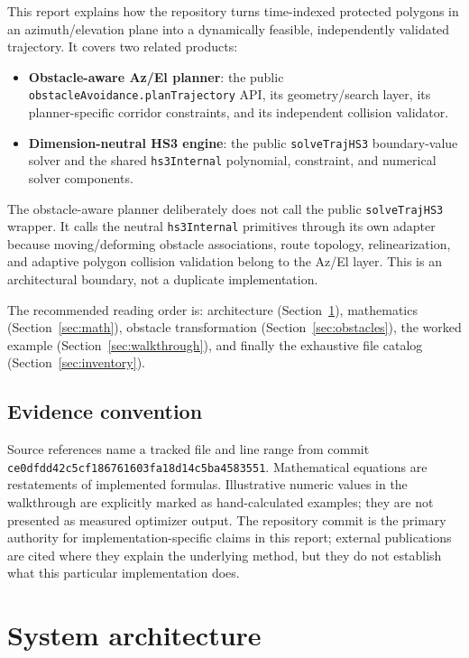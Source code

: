 \documentclass[10pt,letterpaper]{article}
\newcommand{\file}[1]{\nolinkurl{#1}}
\newcommand{\term}[1]{\textbf{#1}}
\begin{document}
This report explains how the repository turns time-indexed protected polygons
in an azimuth/elevation plane into a dynamically feasible, independently
validated trajectory. It covers two related products:

\begin{itemize}
  \item \term{Obstacle-aware Az/El planner}: the public
  \file{obstacleAvoidance.planTrajectory} API, its geometry/search layer, its
  planner-specific corridor constraints, and its independent collision
  validator.
  \item \term{Dimension-neutral HS3 engine}: the public
  \file{solveTrajHS3} boundary-value solver and the shared
  \file{hs3Internal} polynomial, constraint, and numerical solver components.
\end{itemize}

The obstacle-aware planner deliberately does not call the public
\file{solveTrajHS3} wrapper. It calls the neutral \file{hs3Internal}
primitives through its own adapter because moving/deforming obstacle
associations, route topology, relinearization, and adaptive polygon collision
validation belong to the Az/El layer. This is an architectural boundary, not a
duplicate implementation.

The recommended reading order is: architecture (Section~\ref{sec:architecture}),
mathematics (Section~\ref{sec:math}), obstacle transformation
(Section~\ref{sec:obstacles}), the worked example
(Section~\ref{sec:walkthrough}), and finally the exhaustive file catalog
(Section~\ref{sec:inventory}).

\subsection{Evidence convention}

Source references name a tracked file and line range from commit
\file{ce0dfdd42c5cf186761603fa18d14c5ba4583551}. Mathematical equations are
restatements of implemented formulas. Illustrative numeric values in the
walkthrough are explicitly marked as hand-calculated examples; they are not
presented as measured optimizer output. The repository commit is the primary
authority for implementation-specific claims in this report\cite{repoCommit};
external publications are cited where they explain the underlying method, but
they do not establish what this particular implementation does.

\section{System architecture}\label{sec:architecture}
\end{document}
